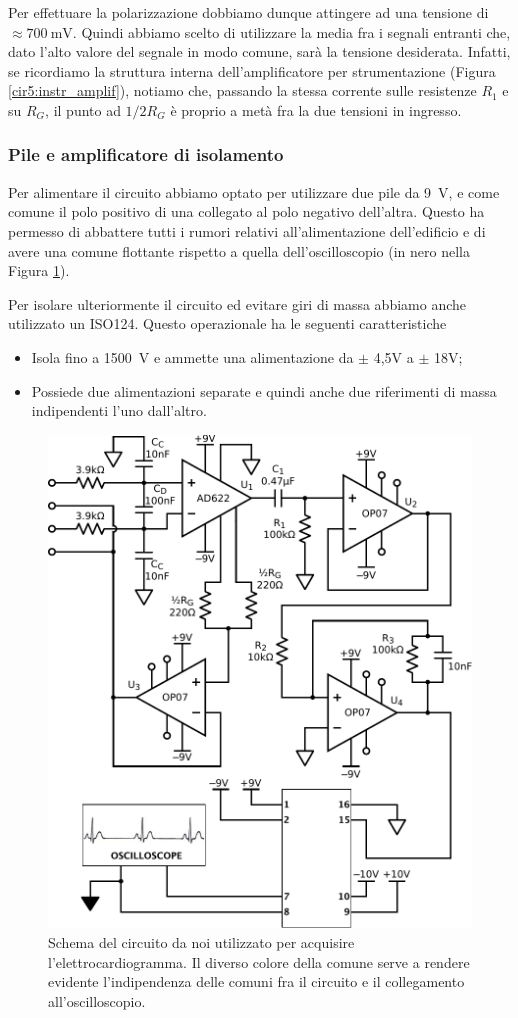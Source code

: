 Per effettuare la polarizzazione dobbiamo dunque attingere ad una tensione di $\approx \SI{700}{\milli\volt}$. Quindi abbiamo scelto di utilizzare la media fra i segnali entranti che, dato l'alto valore del segnale in modo comune, sarà la tensione desiderata. Infatti, se ricordiamo la struttura interna dell'amplificatore per strumentazione (Figura \ref{cir5:instr_amplif}), notiamo che, passando la stessa corrente sulle resistenze $R_1$ e su $R_G$, il punto ad $1/2 R_G$ è proprio a metà fra la due tensioni in ingresso.

\subsubsection*{Pile e amplificatore di isolamento}

Per alimentare il circuito abbiamo optato per utilizzare due pile da \SI{9}{\volt}, e come comune il polo positivo di una collegato al polo negativo dell'altra. Questo ha permesso di abbattere tutti i rumori relativi all'alimentazione dell'edificio e di avere una comune flottante rispetto a quella dell'oscilloscopio (in nero nella Figura \ref{cir8:compensation}).

Per isolare ulteriormente il circuito ed evitare giri di massa abbiamo anche utilizzato un ISO124. Questo operazionale ha le seguenti caratteristiche
\begin{itemize}[noitemsep]
	\item Isola fino a \SI{1500}{\volt} e ammette una alimentazione da $\pm$ 4,5V a $\pm$ 18V;
	\item Possiede due alimentazioni separate e quindi anche due riferimenti di massa indipendenti l'uno dall'altro.
\end{itemize}

\begin{figure}[tpc]
\centering
\includegraphics[width=.6\textwidth]{../E07/latex/circuito.pdf}
\caption{Schema del circuito da noi utilizzato per acquisire l'elettrocardiogramma. Il diverso colore della comune serve a rendere evidente l'indipendenza delle comuni fra il circuito e il collegamento all'oscilloscopio.}
\label{cir8:compensation}
\end{figure}

